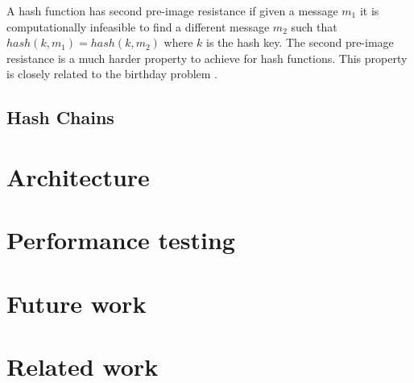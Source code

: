 \documentclass[12pt,conference]{IEEEtran}
\begin{document}
A hash function has second pre-image resistance if given a message $m_{1}$ it is computationally infeasible to find a different message  $m_{2}$ such that $hash(k,m_{1}) = hash(k,m_{2})$ where $k$ is the hash key. The second pre-image resistance is a much harder property to achieve for hash functions. This property is closely related to the birthday problem \cite{lesser_exploring_1999}.

\subsection*{Hash Chains}



\section*{Architecture}
\section*{Performance testing}
\section*{Future work}
\section*{Related work}





\end{document}
